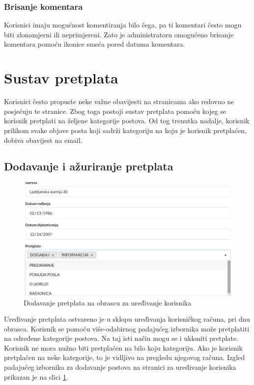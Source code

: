 \documentclass[zavrsni, numeric]{fer}
\begin{document}
\subsubsection{Brisanje komentara}
Korisnici imaju mogućnost komentiranja bilo čega, pa ti komentari često mogu biti zlonamjerni ili neprimjereni. Zato je administratoru omogućeno brisanje komentara pomoću ikonice smeća pored datuma komentara.

\section{Sustav pretplata}
Korisnici često propuste neke važne obavijesti na stranicama ako redovno ne posjećuju te stranice. Zbog toga postoji sustav pretplata pomoću kojeg se korisnik pretplati na željene kategorije postova. Od tog trenutka nadalje, korisnik prilikom svake objave posta koji sadrži kategoriju na koju je korisnik pretplaćen, dobiva obavijest na email.

\subsection{Dodavanje i ažuriranje pretplata}

\begin{figure}[H]
	\centering
	\includegraphics[width=13cm]{slike/pretplate.png}
	\caption{Dodavanje pretplata na obrascu za uređivanje korisnika}
	\label{fig:pretplate}
\end{figure}

Uređivanje pretplata ostvareno je u sklopu uređivanja korisničkog računa, pri dnu obrasca. Korisnik se pomoću više-odabirnog padajućeg izbornika može pretplatiti na određene kategorije postova. Na taj isti način mogu se i ukloniti pretplate. Korisnik ne mora nužno biti pretplaćen na bilo koju kategoriju. Ako je korisnik pretplaćen na neke kategorije, to je vidljivo na pregledu njegovog računa. Izgled padajućeg izbornika za dodavanje postova na stranici za uređivanje korisnika prikazan je na slici \ref{fig:pretplate}.
\end{document}
